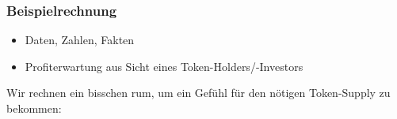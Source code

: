 \vspace{0.5cm}


\subsubsection{Beispielrechnung}
\vspace{0.2cm}


\begin{itemize}
	\item Daten, Zahlen, Fakten
	\item Profiterwartung aus Sicht eines Token-Holders/-Investors
\end{itemize}

\vspace{0.5cm}

Wir rechnen ein bisschen rum, um ein Gefühl für den nötigen Token-Supply zu bekommen:

\vspace{0.3cm}

